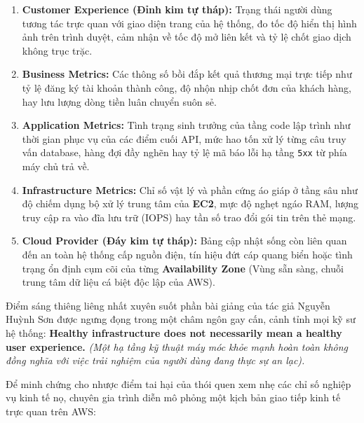 \begin{enumerate}
\def\labelenumi{\arabic{enumi}.}
\tightlist
\item
  \textbf{Customer Experience (Đỉnh kim tự tháp):} Trạng thái người dùng
  tương tác trực quan với giao diện trang của hệ thống, đo tốc độ hiển
  thị hình ảnh trên trình duyệt, cảm nhận về tốc độ mở liên kết và tỷ lệ
  chốt giao dịch không trục trặc.
\item
  \textbf{Business Metrics:} Các thông số bồi đắp kết quả thương mại
  trực tiếp như tỷ lệ đăng ký tài khoản thành công, độ nhộn nhịp chốt
  đơn của khách hàng, hay lưu lượng dòng tiền luân chuyển suôn sẻ.
\item
  \textbf{Application Metrics:} Tình trạng sinh trưởng của tầng code lập
  trình như thời gian phục vụ của các điểm cuối API, mức hao tốn xử lý
  từng câu truy vấn database, hàng đợi đầy nghẽn hay tỷ lệ mã báo lỗi hạ
  tầng \texttt{5xx} từ phía máy chủ trả về.
\item
  \textbf{Infrastructure Metrics:} Chỉ số vật lý và phần cứng áo giáp ở
  tầng sâu như độ chiếm dụng bộ xử lý trung tâm của \textbf{EC2}, mực độ
  nghẹt ngáo RAM, lượng truy cập ra vào đĩa lưu trữ (IOPS) hay tần số
  trao đổi gói tin trên thẻ mạng.
\item
  \textbf{Cloud Provider (Đáy kim tự tháp):} Bảng cập nhật sống còn liên
  quan đến an toàn hệ thống cấp nguồn điện, tín hiệu đứt cáp quang biển
  hoặc tình trạng ổn định cụm cõi của từng \textbf{Availability Zone}
  (Vùng sẵn sàng, chuỗi trung tâm dữ liệu cá biệt độc lập của AWS).
\end{enumerate}

Điểm sáng thiêng liêng nhất xuyên suốt phần bài giảng của tác giả Nguyễn
Huỳnh Sơn được ngưng đọng trong một châm ngôn gay cấn, cảnh tỉnh mọi kỹ
sư hệ thống: \textbf{Healthy infrastructure does not necessarily mean a
healthy user experience.} \emph{(Một hạ tầng kỹ thuật máy móc khỏe mạnh
hoàn toàn không đồng nghĩa với việc trải nghiệm của người dùng đang thực
sự an lạc).}

Để minh chứng cho nhược điểm tai hại của thói quen xem nhẹ các chỉ số
nghiệp vụ kinh tế nọ, chuyên gia trình diễn mô phỏng một kịch bản giao
tiếp kinh tế trực quan trên AWS:

